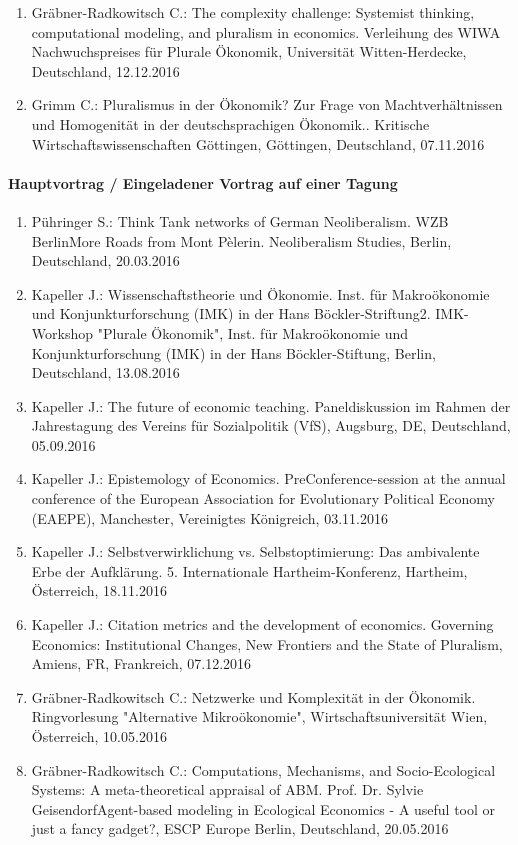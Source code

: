 \begin{enumerate}
	\item Gräbner-Radkowitsch C.: The complexity challenge: Systemist thinking, computational modeling, and pluralism in economics. Verleihung des WIWA Nachwuchspreises für Plurale Ökonomik, Universität Witten-Herdecke, Deutschland, 12.12.2016
	\item Grimm C.: Pluralismus in der Ökonomik? Zur Frage von Machtverhältnissen und Homogenität in der deutschsprachigen Ökonomik.. Kritische Wirtschaftswissenschaften Göttingen, Göttingen, Deutschland, 07.11.2016
\end{enumerate}
\paragraph{Hauptvortrag / Eingeladener Vortrag auf einer Tagung}
\begin{enumerate}
	\item Pühringer S.: Think Tank networks of German Neoliberalism. WZB BerlinMore Roads from Mont Pèlerin. Neoliberalism Studies, Berlin, Deutschland, 20.03.2016
	\item Kapeller J.: Wissenschaftstheorie und Ökonomie. Inst. für Makroökonomie und  Konjunkturforschung (IMK) in der Hans Böckler-Striftung2. IMK-Workshop "Plurale Ökonomik", Inst. für Makroökonomie und Konjunkturforschung (IMK) in der Hans Böckler-Stiftung, Berlin, Deutschland, 13.08.2016
	\item Kapeller J.: The future of economic teaching. Paneldiskussion im Rahmen der Jahrestagung des Vereins für Sozialpolitik (VfS), Augsburg, DE, Deutschland, 05.09.2016
	\item Kapeller J.: Epistemology of Economics. PreConference-session at the annual conference of the European Association for Evolutionary Political Economy (EAEPE), Manchester, Vereinigtes Königreich, 03.11.2016
	\item Kapeller J.: Selbstverwirklichung vs. Selbstoptimierung: Das ambivalente Erbe der Aufklärung. 5. Internationale Hartheim-Konferenz, Hartheim, Österreich, 18.11.2016
	\item Kapeller J.: Citation metrics and the development of economics. Governing Economics: Institutional Changes, New Frontiers and the State of Pluralism, Amiens, FR, Frankreich, 07.12.2016
	\item Gräbner-Radkowitsch C.: Netzwerke und Komplexität in der Ökonomik. Ringvorlesung "Alternative Mikroökonomie", Wirtschaftsuniversität Wien, Österreich, 10.05.2016
	\item Gräbner-Radkowitsch C.: Computations, Mechanisms, and Socio-Ecological Systems: A meta-theoretical appraisal of ABM. Prof. Dr. Sylvie GeisendorfAgent-based modeling in Ecological Economics - A useful tool or just a fancy gadget?, ESCP Europe Berlin, Deutschland, 20.05.2016
\end{enumerate}
